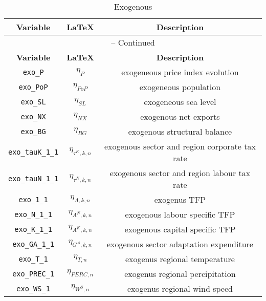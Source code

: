 \begin{center}
\begin{longtable}{ccc}
\caption{Exogenous}\\%
\hline%
\multicolumn{1}{c}{\textbf{Variable}} &
\multicolumn{1}{c}{\textbf{\LaTeX}} &
\multicolumn{1}{c}{\textbf{Description}}\\%
\hline\hline%
\endfirsthead
\multicolumn{3}{c}{{\tablename} \thetable{} -- Continued}\\%
\hline%
\multicolumn{1}{c}{\textbf{Variable}} &
\multicolumn{1}{c}{\textbf{\LaTeX}} &
\multicolumn{1}{c}{\textbf{Description}}\\%
\hline\hline%
\endhead
\texttt{exo\_P} & ${\eta_{P}}$ & exogeneous price index evolution\\
\texttt{exo\_PoP} & ${\eta_{PoP}}$ & exogeneous population\\
\texttt{exo\_SL} & ${\eta_{SL}}$ & exogeneous sea level\\
\texttt{exo\_NX} & ${\eta_{NX}}$ & exogenous net exports\\
\texttt{exo\_BG} & ${\eta_{BG}}$ & exogenous structural balance\\
\texttt{exo\_tauK\_1\_1} & ${\eta_{\tau^{K},k,n}}$ & exogenous sector and region corporate tax rate\\
\texttt{exo\_tauN\_1\_1} & ${\eta_{\tau^{N},k,n}}$ & exogenous sector and region labour tax rate\\
\texttt{exo\_1\_1} & ${\eta_{A,k,n}}$ & exogenus TFP\\
\texttt{exo\_N\_1\_1} & ${\eta_{A^{N},k,n}}$ & exogenous labour specific TFP\\
\texttt{exo\_K\_1\_1} & ${\eta_{A^{K},k,n}}$ & exogenous capital specific TFP\\
\texttt{exo\_GA\_1\_1} & ${\eta_{G^{A},k,n}}$ & exogenous sector adaptation expenditure\\
\texttt{exo\_T\_1} & ${\eta_{T,n}}$ & exogenus regional temperature\\
\texttt{exo\_PREC\_1} & ${\eta_{PERC,n}}$ & exogenus regional percipitation\\
\texttt{exo\_WS\_1} & ${\eta_{W^{S},n}}$ & exogenus regional wind speed\\
\hline%
\end{longtable}
\end{center}
